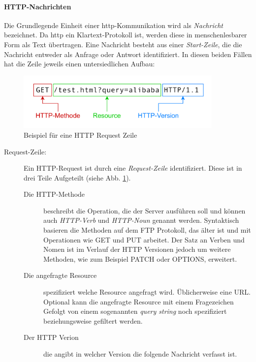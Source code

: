 \paragraph{HTTP-Nachrichten}
Die Grundlegende Einheit einer \ac{http}-Kommunikation wird als \textit{Nachricht} bezeichnet.
Da \ac{http} ein Klartext-Protokoll ist, werden diese in menschenlesbarer Form als Text übertragen.
Eine Nachricht besteht aus einer \textit{Start-Zeile}, die die Nachricht entweder als Anfrage oder Antwort identifiziert. In diesen beiden Fällen hat die Zeile jeweils einen untersiedlichen Aufbau:

\begin{figure}[!hbt]
     \centering
     \includegraphics[width=0.9\textwidth]{./images/HTTP-Requestline.png}
     \caption{Beispiel für eine HTTP Request Zeile}
     \label{fig:http-requestline}
 \end{figure}

\begin{description}
     \item[Request-Zeile:] Ein HTTP-Request ist durch eine \textit{Request-Zeile} identifiziert. Diese ist in drei Teile Aufgeteilt (siehe Abb. \ref{fig:http-requestline}).
     \begin{description}
          \item[Die HTTP-Methode] beschreibt die Operation, die der Server ausführen soll und können auch \textit{HTTP-Verb} und \textit{HTTP-Noun} genannt werden.
          Syntaktisch basieren die Methoden auf dem FTP Protokoll, das älter ist und mit Operationen wie GET und PUT arbeitet.
          Der Satz an Verben und Nomen ist im Verlauf der HTTP Versionen jedoch um weitere Methoden, wie zum Beispiel PATCH oder OPTIONS, erweitert.
          \item[Die angefragte Resource] spezifiziert welche Resource angefragt wird. Üblicherweise eine URL. Optional kann die angefragte Resource mit einem Fragezeichen Gefolgt von einem sogenannten \textit{query string} noch spezifiziert beziehungsweise gefiltert werden.
          \item[Der HTTP Verion] die angibt in welcher Version die folgende Nachricht verfasst ist. 
     \end{description}
\end{description}

